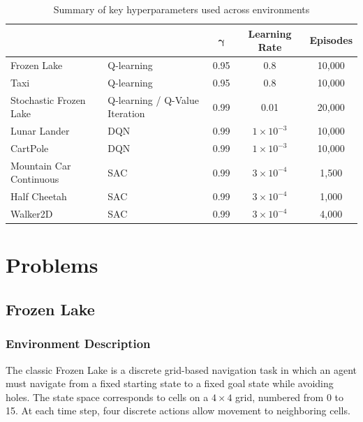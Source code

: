 \documentclass[10pt]{article}
\begin{document}
\begin{table}[h]
\centering
\small
\setlength{\tabcolsep}{4pt}
\begin{tabularx}{\linewidth}{YYccc}
\hline
{} &  & $\boldsymbol{\gamma}$ & \bfseries Learning Rate & \bfseries Episodes \\
\hline
Frozen Lake & Q-learning & 0.95 & 0.8 & 10{,}000 \\
Taxi & Q-learning & 0.95 & 0.8 & 10{,}000 \\
Stochastic Frozen Lake & Q-learning / Q-Value Iteration & 0.99 & 0.01 & 20{,}000 \\
Lunar Lander & DQN & 0.99 & $1\times10^{-3}$ & 10{,}000 \\
CartPole & DQN & 0.99 & $1\times10^{-3}$ & 10{,}000 \\
Mountain Car Continuous & SAC & 0.99 & $3\times10^{-4}$ & 1{,}500 \\
Half Cheetah & SAC & 0.99 & $3\times10^{-4}$ & 1{,}000 \\
 Walker2D & SAC & 0.99 & $3\times10^{-4}$ & 4{,}000 \\
 \hline
\end{tabularx}
\caption{Summary of key hyperparameters used across environments}
\end{table}


\section{Problems}

\vspace{1em}


\subsection{Frozen Lake}

\vspace{1em}

\subsubsection{Environment Description}
The classic Frozen Lake is a discrete grid-based navigation task in which an agent must navigate from a fixed starting state to a fixed goal state while avoiding holes. The state space corresponds to cells on a $4 \times 4$ grid, numbered from 0 to 15. At each time step, four discrete actions allow movement to neighboring cells.
\end{document}
